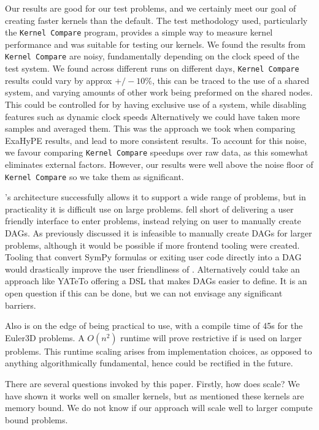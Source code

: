 Our results are good for our test problems, and we certainly meet our goal of creating faster kernels than the default.
The test methodology used, particularly the \texttt{Kernel Compare} program, provides a simple way to measure kernel performance and was suitable for testing our kernels.
We found the results from \texttt{Kernel Compare} are noisy, fundamentally depending on the clock speed of the test system.
We found across different runs on different days, \texttt{Kernel Compare} results could vary by approx $+/-10\%$, this can be traced to the use of a shared system, and varying amounts of other work being preformed on the shared nodes.
This could be controlled for by having exclusive use of a system, while disabling features such as dynamic clock speeds
Alternatively we could have taken more samples and averaged them.
This was the approach we took when comparing ExaHyPE results, and lead to more consistent results.
To account for this noise, we favour comparing \texttt{Kernel Compare} speedups over raw data, as this somewhat eliminates external factors.
However, our results were well above the noise floor of \texttt{Kernel Compare} so we take them as significant.

\phlat{}'s architecture successfully allows it to support a wide range of problems, but in practicality it is difficult use \phlat on large problems.
\phlat fell short of delivering a user friendly interface to enter problems, instead relying on user to manually create DAGs.
As previously discussed it is infeasible to manually create DAGs for larger problems, although it would be possible if more frontend tooling were created.
Tooling that convert SymPy formulas \cite{sympy} or exiting user code directly into a DAG would drastically improve the user friendliness of \phlat.
Alternatively \phlat could take an approach like YATeTo offering a DSL that makes DAGs easier to define.
It is an open question if this can be done, but we can not envisage any significant barriers.

Also \phlat is on the edge of being practical to use, with a compile time of 45s for the Euler3D problems.
A $O(n^2)$ runtime will prove restrictive if \phlat is used on larger problems.
This runtime scaling arises from implementation choices, as opposed to anything algorithmically fundamental, hence could be rectified in the future.

There are several questions invoked by this paper.
Firstly, how does \phlat scale?
We have shown it works well on smaller kernels, but as mentioned these kernels are memory bound.
We do not know if our approach will scale well to larger compute bound problems.

